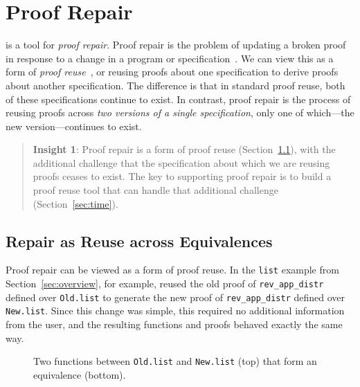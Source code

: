 \section{Proof Repair}
\label{sec:key1}

\toolname is a tool for \textit{proof repair}.
Proof repair is the problem of updating a broken proof in response to a change in a program or specification~\cite{PGL-045, pumpkinpatch}.
We can view this as a form of 
\textit{proof reuse}~\cite{Ringer2019, felty1994generalization, caplan1995logical, pons2000generalization, johnsen2004theorem}, %
or reusing proofs about one specification to derive proofs about another specification.
The difference is that in standard proof reuse, both of these specifications continue to exist.
In contrast, proof repair is the process of reusing proofs across \textit{two versions of a single specification},
only one of which---the new version---continues to exist.

\begin{quote}
\textbf{Insight 1}:
Proof repair is a form of proof reuse (Section~\ref{sec:repair}), with the additional
challenge that the specification about which
we are reusing proofs ceases to exist.
The key to supporting proof repair is to build a proof reuse
tool that can handle that additional challenge (Section~\ref{sec:time}).
\end{quote}

\subsection{Repair as Reuse across Equivalences}
\label{sec:repair}

Proof repair can be viewed as a form of proof reuse. 
In the \lstinline{list} example from Section~\ref{sec:overview}, for example, \toolname
reused the old proof of \lstinline{rev_app_distr} defined over \lstinline{Old.list}
to generate the new proof of \lstinline{rev_app_distr} defined over \lstinline{New.list}.
Since this change was simple, this required no additional information from the user, and the resulting functions
and proofs behaved exactly the same way.

\begin{figure}
\begin{minipage}{0.48\textwidth}
\codeauto{}
\end{minipage}
\codeauto{\hfill}
\begin{minipage}{0.48\textwidth}
\codeauto{}
\end{minipage}
\caption{Two functions between \lstinline{Old.list} and \lstinline{New.list} (top) that form an equivalence (bottom).}
\label{fig:equivalence}
\end{figure}

